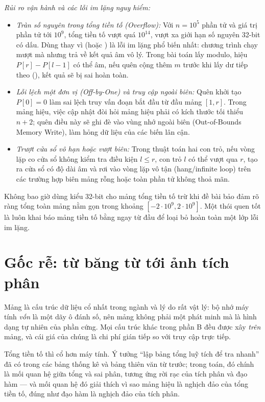 \documentclass[../../algorithm.tex]{subfiles}
\begin{document}
\emph{Rủi ro vận hành và các lỗi im lặng nguy hiểm:}
\begin{itemize}
\item \emph{Tràn số nguyên trong tổng tiền tố (Overflow):} Với \(n = 10^5\) phần tử và giá trị phần tử tới \(10^9\), tổng tiền tố vượt quá \(10^{14}\), vượt xa giới hạn số nguyên 32-bit có dấu. Dùng  thay vì  (hoặc ) là lỗi im lặng phổ biến nhất: chương trình chạy mượt mà nhưng trả về kết quả âm vô lý. Trong bài toán lấy modulo, hiệu \(P[r] - P[l-1]\) có thể âm, nếu quên cộng thêm \(m\) trước khi lấy dư tiếp theo (), kết quả sẽ bị sai hoàn toàn.
\item \emph{Lỗi lệch một đơn vị (Off-by-One) và truy cập ngoài biên:} Quên khởi tạo \(P[0] = 0\) làm sai lệch truy vấn đoạn bắt đầu từ đầu mảng \([1, r]\). Trong mảng hiệu, việc cập nhật  đòi hỏi mảng hiệu phải có kích thước tối thiểu \(n+2\); quên điều này sẽ ghi đè vào vùng nhớ ngoài biên (Out-of-Bounds Memory Write), làm hỏng dữ liệu của các biến lân cận.
\item \emph{Trượt cửa sổ vô hạn hoặc vượt biên:} Trong thuật toán hai con trỏ, nếu vòng lặp co cửa sổ không kiểm tra điều kiện \(l \le r\), con trỏ \(l\) có thể vượt qua \(r\), tạo ra cửa sổ có độ dài âm và rơi vào vòng lặp vô tận (hang/infinite loop) trên các trường hợp biên mảng rỗng hoặc toàn phần tử không thoả mãn.
\end{itemize}

\begin{cambay}
Không bao giờ dùng kiểu  32-bit cho mảng tổng tiền tố trừ khi đề bài bảo đảm rõ ràng tổng toàn mảng nằm gọn trong khoảng \([-2\cdot 10^9, 2\cdot 10^9]\). Một thói quen tốt là luôn khai báo mảng tiền tố bằng  ngay từ đầu để loại bỏ hoàn toàn một lớp lỗi im lặng.
\end{cambay}

\section{Gốc rễ: từ băng từ tới ảnh tích phân}

Mảng là cấu trúc dữ liệu cổ nhất trong ngành và lý do rất vật lý: bộ nhớ máy tính \emph{vốn} là một dãy ô đánh số, nên mảng không phải một phát minh mà là hình dạng tự nhiên của phần cứng. Mọi cấu trúc khác trong phần B đều được xây \emph{trên} mảng, và cái giá của chúng là chi phí gián tiếp so với truy cập trực tiếp.

Tổng tiền tố thì cổ hơn máy tính. Ý tưởng ``lập bảng tổng luỹ tích để tra nhanh'' đã có trong các bảng thống kê và bảng thiên văn từ trước; trong toán, đó chính là mối quan hệ giữa tổng và sai phân, tương ứng rời rạc của tích phân và đạo hàm --- và mối quan hệ đó giải thích vì sao mảng hiệu là nghịch đảo của tổng tiền tố, đúng như đạo hàm là nghịch đảo của tích phân.
\end{document}
